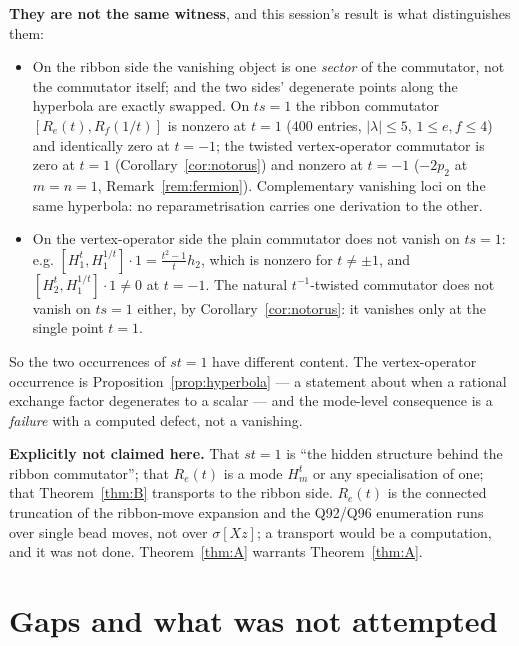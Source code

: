 \documentclass[11pt]{article}
\theoremstyle{definition}
\newcommand{\Hop}{H}
\begin{document}
\noindent\textbf{They are not the same witness}, and this session's result is what
distinguishes them:
\begin{itemize}
\item On the ribbon side the vanishing object is one \emph{sector} of the commutator, not the
commutator itself; and the two sides' degenerate points along the hyperbola are exactly
swapped. On $ts=1$ the ribbon commutator $[R_e(t),R_f(1/t)]$ is nonzero at $t=1$ ($400$
entries, $|\lambda|\le5$, $1\le e,f\le4$) and identically zero at $t=-1$; the twisted
vertex-operator commutator is zero at $t=1$ (Corollary~\ref{cor:notorus}) and nonzero at
$t=-1$ ($-2p_2$ at $m=n=1$, Remark~\ref{rem:fermion}). Complementary vanishing loci on the
same hyperbola: no reparametrisation carries one derivation to the other.
\item On the vertex-operator side the plain commutator does not vanish on $ts=1$: e.g.
$[\Hop^t_1,\Hop^{1/t}_1]\cdot1=\frac{t^2-1}{t}h_2$, which is nonzero for $t\neq\pm1$, and
$[\Hop^t_2,\Hop^{1/t}_1]\cdot1\neq0$ at $t=-1$. The natural $t^{-1}$-twisted commutator does
not vanish on $ts=1$ either, by Corollary~\ref{cor:notorus}: it vanishes only at the single
point $t=1$.
\end{itemize}
So the two occurrences of $st=1$ have different content. The vertex-operator occurrence is
Proposition~\ref{prop:hyperbola} --- a statement about when a rational exchange factor
degenerates to a scalar --- and the mode-level consequence is a \emph{failure} with a
computed defect, not a vanishing.

\medskip\noindent\textbf{Explicitly not claimed here.} That $st=1$ is ``the hidden structure
behind the ribbon commutator''; that $R_e(t)$ is a mode $\Hop^t_m$ or any specialisation of
one; that Theorem~\ref{thm:B} transports to the ribbon side. $R_e(t)$ is the connected
truncation of the ribbon-move expansion and the Q92/Q96 enumeration runs over single bead
moves, not over $\sigma[Xz]$; a transport would be a computation, and it was not done.
Theorem~\ref{thm:A} warrants Theorem~\ref{thm:A}.

\section{Gaps and what was not attempted}
\end{document}
